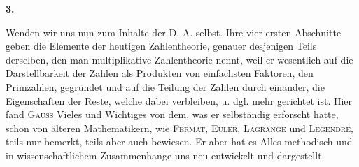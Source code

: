 \par\bigskip{}
\begin{center}\end{center}
\begin{center}\bfseries 3.\end{center}
\noindent\hspace*{\parindent}Wenden wir uns nun zum Inhalte der D. A. selbst. Ihre vier ersten Abschnitte geben die Elemente der heutigen Zahlentheorie, genauer desjenigen Teils derselben, den man multiplikative Zahlentheorie nennt, weil er wesentlich auf die Darstellbarkeit der Zahlen als Produkten von einfachsten Faktoren, den Primzahlen, gegründet und auf die Teilung der Zahlen durch einander, die Eigenschaften der Reste, welche dabei verbleiben, u. dgl. mehr gerichtet ist. Hier fand \textsc{Gauss} Vieles und Wichtiges von dem, was er selbständig erforscht hatte, schon von älteren Mathematikern, wie \textsc{Fermat}, \textsc{Euler}, \textsc{Lagrange} und \textsc{Legendre}, teils nur bemerkt, teils aber auch bewiesen. Er aber hat es Alles methodisch und in wissenschaftlichem Zusammenhange uns neu entwickelt und dargestellt.

